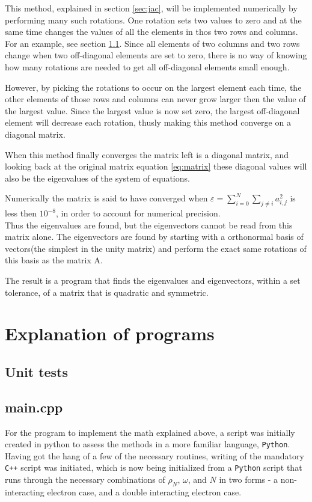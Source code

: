\documentclass[11pt,a4paper,notitlepage]{article}
\begin{document}
This method, explained in section \ref{sec:jac}, will be implemented numerically by performing many such rotations. One rotation sets two values to zero and at the same time changes the values of all the elements in thos two rows and columns. For an example, see section \ref{sec:unit tests}. Since all elements of two columns and two rows change when two off-diagonal elements are set to zero, there is no way of knowing how many rotations are needed to get all off-diagonal elements small enough.

However, by picking the rotations to occur on the largest element each time,
the other elements of those rows and columns can never grow larger then the value of the largest value. Since the largest value is now set zero, the largest off-diagonal element will decrease each rotation, thusly making this method converge on a diagonal matrix. 

When this method finally converges the matrix left is a diagonal matrix, and looking back at the original matrix equation \eqref{eq:matrix} these diagonal values will also be the eigenvalues of the system of equations.

Numerically the matrix is said to have converged when $\varepsilon = \sum_{i=0}^N \sum_{j\neq i} a_{i,j}^2$ is less then $10^{-8}$, in order to account for numerical precision. \\

Thus the eigenvalues are found, but the eigenvectors cannot be read from this matrix alone. The eigenvectors are found by starting with a orthonormal basis of vectors(the simplest in the unity matrix) and perform the exact same rotations of this basis as the matrix A.

The result is a program that finds the eigenvalues and eigenvectors, within a set tolerance, of a matrix that is quadratic and symmetric.

\section{Explanation of programs}
\subsection{Unit tests} \label{sec:unit tests}

\subsection{main.cpp}
For the program to implement the math explained above, a script was initially created in python to assess the methods in a more familiar language, \verb|Python|. Having got the hang of a few of the necessary routines, writing of the mandatory \verb|C++| script was initiated, which is now being initialized from a \verb|Python| script that runs through the necessary combinations of $\rho_N$, $\omega$, and $N$ in two forms - a non-interacting electron case, and a double interacting electron case.
\end{document}

